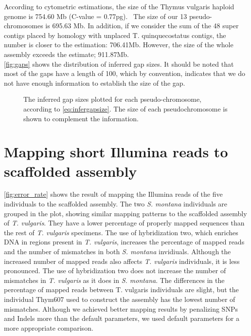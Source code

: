 According to cytometric estimations, the size of the Thymus vulgaris haploid genome is 754.60 Mb (C-value = 0.77pg).~\cite{marieCytometricExercisePlant1993,PlantDNACvalues} The size of our 13 pseudo-chromosomes is 695.63 Mb. In addition, if we consider the sum of the 48 super contigs placed by homology with unplaced T. quinquecostatus contigs, the number is closer to the estimation:  706.41Mb. However, the size of the whole assembly exceeds the estimate; 911.87Mb.\\

\autoref{fig:gaps} shows the distribution of inferred gap sizes. It should be noted that most of the gaps have a length of 100, which by convention, indicates that we do not have enough information to establish the size of the gap.~\cite{AGPSpecificationV2} \\

\begin{figure}
    \centering
    \def\svgwidth{\textwidth}
    
    \caption{The inferred gap sizes plotted for each pseudo-chromosome, according to \eqref{eq:infergapsize}. The size of each pseudochromosome is shown to complement the information.}    
    \label{fig:gaps}
\end{figure}   

\section{Mapping short Illumina reads to scaffolded assembly}

\autoref{fig:error_rate} shows the result of mapping the Illumina reads of the five individuals to the scaffolded assembly. The two \textit{S. montana} individuals are grouped in the plot, showing similar mapping patterns to the scaffolded assembly of \textit{T. vulgaris}. They have a lower percentage of properly mapped sequences than the rest of \textit{T. vulgaris} specimens. The use of hybridization two, which enriches DNA in regions present in \textit{T. vulgaris}, increases the percentage of mapped reads and the number of mismatches in both \textit{S. montana} invidiuals. Although the increased number of mapped reads also affects \textit{T. vulgaris} individuals, it is less pronounced. The use of hybridization two does not increase the number of mismatches in \textit{T. vulgaris} as it does in \textit{S. montana}. The differences in the percentage of mapped reads between T. vulgaris individuals are slight, but the individual Thym607 used to construct the assembly has the lowest number of mismatches. Although we achieved better mapping results by penalizing SNPs and Indels more than the default parameters, we used default parameters for a more appropriate comparison.



